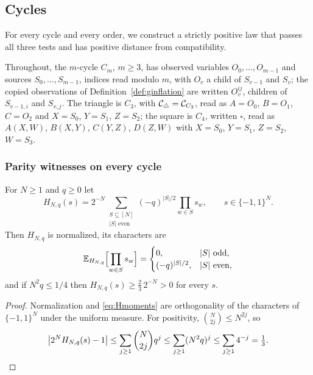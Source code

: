 \providecommand{\Cscen}[1]{\mathcal C_{#1}}
\providecommand{\Csq}{\mathcal C_{\square}}
\providecommand{\Ccyc}{\mathcal C_{C_m}}
\providecommand{\Real}{\operatorname{Re}}
\providecommand{\sgn}{\operatorname{sgn}}

\subsection{Cycles}\label{sec:cycles}

For every cycle and every order, we construct a strictly positive law that passes all three tests and has positive distance from compatibility.

Throughout, the $m$-cycle $C_m$, $m\ge3$, has observed variables $O_0,\dots,O_{m-1}$ and sources $S_0,\dots,S_{m-1}$, indices read modulo $m$, with $O_v$ a child of $S_{v-1}$ and $S_v$; the copied observations of Definition~\ref{def:ginflation} are written $O_v^{ij}$, children of $S_{v-1,i}$ and $S_{v,j}$. The triangle is $C_3$, with $\Ctri=\Cscen{C_3}$, read as $A=O_0$, $B=O_1$, $C=O_2$ and $X=S_0$, $Y=S_1$, $Z=S_2$; the square is $C_4$, written $\square$, read as $A(X,W)$, $B(X,Y)$, $C(Y,Z)$, $D(Z,W)$ with $X=S_0$, $Y=S_1$, $Z=S_2$, $W=S_3$.

\subsubsection{Parity witnesses on every cycle}\label{sec:cycleparity}

\begin{lemma}\label{lem:parityaux}
For $N\ge1$ and $q\ge0$ let
\begin{equation}\label{eq:Hdensity}
H_{N,q}(s)=2^{-N}\sum_{\substack{S\subseteq[N]\\|S|\text{ even}}}(-q)^{|S|/2}\prod_{w\in S}s_w,
\qquad s\in\{-1,1\}^N .
\end{equation}
Then $H_{N,q}$ is normalized, its characters are
\begin{equation}\label{eq:Hmoments}
\mathbb E_{H_{N,q}}\Bigl[\prod_{w\in S}s_w\Bigr]=
\begin{cases}
0,&|S|\text{ odd},\\
(-q)^{|S|/2},&|S|\text{ even},
\end{cases}
\end{equation}
and if $N^2q\le1/4$ then $H_{N,q}(s)\ge\tfrac23\,2^{-N}>0$ for every $s$.
\end{lemma}

\begin{proof}
Normalization and \eqref{eq:Hmoments} are orthogonality of the characters of $\{-1,1\}^N$ under the uniform measure. For positivity, $\binom N{2j}\le N^{2j}$, so
\[
\bigl|2^NH_{N,q}(s)-1\bigr|\le\sum_{j\ge1}\binom N{2j}q^j\le\sum_{j\ge1}(N^2q)^j\le\sum_{j\ge1}4^{-j}=\tfrac13 . \qedhere
\]
\end{proof}

